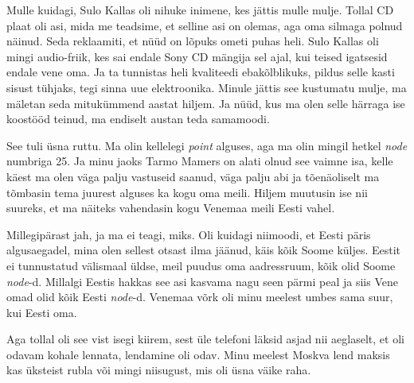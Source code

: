 
Mulle kuidagi, Sulo Kallas oli nihuke inimene, kes 
jättis mulle mulje. Tollal CD plaat oli asi, mida me teadsime, et selline asi 
on olemas, aga oma silmaga polnud näinud. Seda reklaamiti, et  nüüd on lõpuks 
ometi puhas heli. Sulo Kallas oli mingi audio-friik, kes sai endale Sony CD 
mängija sel ajal, kui teised igatsesid endale vene oma. Ja  ta tunnistas heli 
kvaliteedi ebakõlblikuks, pildus selle kasti sisust tühjaks, tegi sinna uue 
elektroonika. Minule jättis see kustumatu mulje, ma mäletan seda mitukümmend 
aastat hiljem. Ja nüüd, kus ma olen selle härraga  ise koostööd teinud, ma 
endiselt austan teda samamoodi. 


See tuli üsna ruttu. Ma olin kellelegi \emph{point} alguses, aga ma olin mingil 
hetkel  \emph{node} numbriga 25. Ja minu jaoks Tarmo Mamers on  alati olnud see vaimne isa, kelle käest ma olen väga palju vastuseid 
saanud, väga palju abi ja tõenäoliselt ma tõmbasin tema juurest alguses ka kogu 
oma meili. Hiljem muutusin ise nii suureks, et ma näiteks vahendasin kogu 
Venemaa meili Eesti vahel. 


Millegipärast jah, ja ma ei teagi, miks. Oli kuidagi niimoodi, et Eesti päris 
algusaegadel, mina olen sellest otsast ilma jäänud, käis kõik Soome küljes. 
Eestit ei tunnustatud välismaal üldse, meil puudus oma aadressruum, kõik olid 
Soome \emph{node}-d. Millalgi Eestis hakkas see asi kasvama nagu seen pärmi 
peal ja siis Vene omad olid kõik Eesti \emph{node}-d. Venemaa võrk oli minu 
meelest umbes sama suur, kui Eesti oma. 


Aga tollal oli see vist isegi kiirem, sest üle telefoni läksid asjad nii 
aeglaselt, et oli odavam kohale lennata,   lendamine oli odav. Minu meelest 
Moskva lend maksis kas üksteist rubla või mingi niisugust, mis oli üsna väike 
raha.


